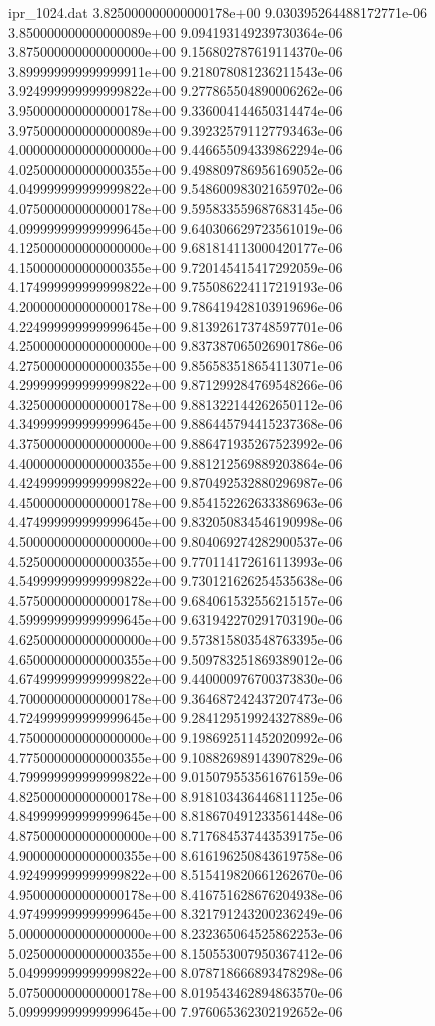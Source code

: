 \begin{filecontents}{ipr_1024.dat}
3.825000000000000178e+00 9.030395264488172771e-06
3.850000000000000089e+00 9.094193149239730364e-06
3.875000000000000000e+00 9.156802787619114370e-06
3.899999999999999911e+00 9.218078081236211543e-06
3.924999999999999822e+00 9.277865504890006262e-06
3.950000000000000178e+00 9.336004144650314474e-06
3.975000000000000089e+00 9.392325791127793463e-06
4.000000000000000000e+00 9.446655094339862294e-06
4.025000000000000355e+00 9.498809786956169052e-06
4.049999999999999822e+00 9.548600983021659702e-06
4.075000000000000178e+00 9.595833559687683145e-06
4.099999999999999645e+00 9.640306629723561019e-06
4.125000000000000000e+00 9.681814113000420177e-06
4.150000000000000355e+00 9.720145415417292059e-06
4.174999999999999822e+00 9.755086224117219193e-06
4.200000000000000178e+00 9.786419428103919696e-06
4.224999999999999645e+00 9.813926173748597701e-06
4.250000000000000000e+00 9.837387065026901786e-06
4.275000000000000355e+00 9.856583518654113071e-06
4.299999999999999822e+00 9.871299284769548266e-06
4.325000000000000178e+00 9.881322144262650112e-06
4.349999999999999645e+00 9.886445794415237368e-06
4.375000000000000000e+00 9.886471935267523992e-06
4.400000000000000355e+00 9.881212569889203864e-06
4.424999999999999822e+00 9.870492532880296987e-06
4.450000000000000178e+00 9.854152262633386963e-06
4.474999999999999645e+00 9.832050834546190998e-06
4.500000000000000000e+00 9.804069274282900537e-06
4.525000000000000355e+00 9.770114172616113993e-06
4.549999999999999822e+00 9.730121626254535638e-06
4.575000000000000178e+00 9.684061532556215157e-06
4.599999999999999645e+00 9.631942270291703190e-06
4.625000000000000000e+00 9.573815803548763395e-06
4.650000000000000355e+00 9.509783251869389012e-06
4.674999999999999822e+00 9.440000976700373830e-06
4.700000000000000178e+00 9.364687242437207473e-06
4.724999999999999645e+00 9.284129519924327889e-06
4.750000000000000000e+00 9.198692511452020992e-06
4.775000000000000355e+00 9.108826989143907829e-06
4.799999999999999822e+00 9.015079553561676159e-06
4.825000000000000178e+00 8.918103436446811125e-06
4.849999999999999645e+00 8.818670491233561448e-06
4.875000000000000000e+00 8.717684537443539175e-06
4.900000000000000355e+00 8.616196250843619758e-06
4.924999999999999822e+00 8.515419820661262670e-06
4.950000000000000178e+00 8.416751628676204938e-06
4.974999999999999645e+00 8.321791243200236249e-06
5.000000000000000000e+00 8.232365064525862253e-06
5.025000000000000355e+00 8.150553007950367412e-06
5.049999999999999822e+00 8.078718666893478298e-06
5.075000000000000178e+00 8.019543462894863570e-06
5.099999999999999645e+00 7.976065362302192652e-06

\end{filecontents}
